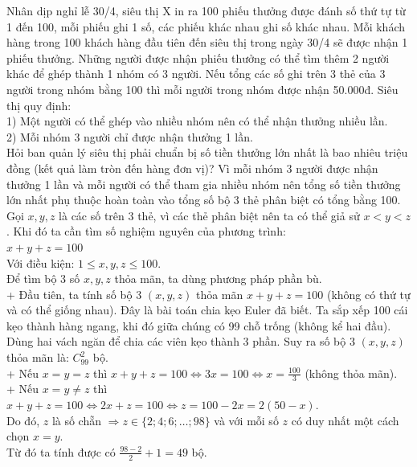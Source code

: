 \begin{ex} %
	Nhân dịp nghỉ lễ 30/4, siêu thị X in ra 100 phiếu thưởng được đánh số thứ tự từ 1 đến 100, mỗi phiếu ghi 1 số, các phiếu khác nhau ghi số khác nhau. Mỗi khách hàng trong 100 khách hàng đầu tiên đến siêu thị trong ngày 30/4 sẽ được nhận 1 phiếu thưởng. Những người được nhận phiếu thưởng có thể tìm thêm 2 người khác để ghép thành 1 nhóm có 3 người. Nếu tổng các số ghi trên 3 thẻ của 3 người trong nhóm bằng 100 thì mỗi người trong nhóm được nhận 50.000đ. Siêu thị quy định:\\
	1) Một người có thể ghép vào nhiều nhóm nên có thể nhận thưởng nhiều lần.\\
	2) Mỗi nhóm 3 người chỉ được nhận thưởng 1 lần.\\
	Hỏi ban quản lý siêu thị phải chuẩn bị số tiền thưởng lớn nhất là bao nhiêu triệu đồng (kết quả làm tròn đến hàng đơn vị)?
	\loigiai
	{
		Vì mỗi nhóm 3 người được nhận thưởng 1 lần và mỗi người có thể tham gia nhiều nhóm nên tổng số tiền thưởng lớn nhất phụ thuộc hoàn toàn vào tổng số bộ 3 thẻ phân biệt có tổng bằng 100.\\
		Gọi $x, y, z$ là các số trên 3 thẻ, vì các thẻ phân biệt nên ta có thể giả sử $x < y < z$. Khi đó ta cần tìm số nghiệm nguyên của phương trình:\\
		$x + y + z = 100$\\
		Với điều kiện: $1 \le x, y, z \le 100$.\\
		Để tìm bộ 3 số $x, y, z$ thỏa mãn, ta dùng phương pháp phần bù.\\
		+ Đầu tiên, ta tính số bộ 3 $(x, y, z)$ thỏa mãn $x + y + z = 100$ (không có thứ tự và có thể giống nhau). Đây là bài toán chia kẹo Euler đã biết. Ta sắp xếp 100 cái kẹo thành hàng ngang, khi đó giữa chúng có 99 chỗ trống (không kể hai đầu). Dùng hai vách ngăn để chia các viên kẹo thành 3 phần. Suy ra số bộ 3 $(x, y, z)$ thỏa mãn là: $C_{99}^2$ bộ.\\
		+ Nếu $x = y = z$ thì $\displaystyle x + y + z = 100 \Leftrightarrow 3x = 100 \Leftrightarrow x = \frac{100}{3}$ (không thỏa mãn).\\
		+ Nếu $x = y \ne z$ thì $x + y + z = 100 \Leftrightarrow 2x + z = 100 \Leftrightarrow z = 100 - 2x = 2(50 - x)$.\\
		Do đó, $z$ là số chẵn $\Rightarrow z \in \{2; 4; 6; \dots; 98\}$ và với mỗi số $z$ có duy nhất một cách chọn $x = y$.\\
		Từ đó ta tính được có $\displaystyle \frac{98 - 2}{2} + 1 = 49$ bộ.\\
}
\end{ex}
